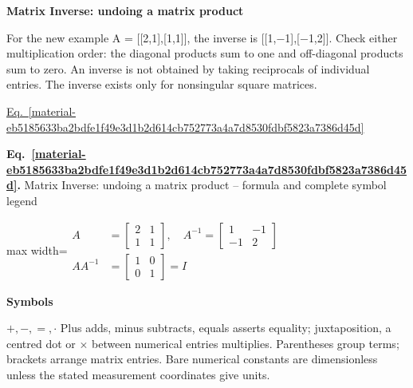 \documentclass[11pt,a4paper]{article}
\begin{document}
\textbf{Matrix Inverse: undoing a matrix product}


For the new example A = [[2,1],[1,1]], the inverse is [[1,\ensuremath{-}1],[\ensuremath{-}1,2]]. Check either multiplication order: the diagonal products sum to one and off-diagonal products sum to zero. An inverse is not obtained by taking reciprocals of individual entries. The inverse exists only for nonsingular square matrices.


\hyperref[material-eb5185633ba2bdfe1f49e3d1b2d614cb752773a4a7d8530fdbf5823a7386d45d]{Eq.~\ref*{material-eb5185633ba2bdfe1f49e3d1b2d614cb752773a4a7d8530fdbf5823a7386d45d}}


\par\medskip
\noindent\begin{minipage}{\linewidth}
\label{material-eb5185633ba2bdfe1f49e3d1b2d614cb752773a4a7d8530fdbf5823a7386d45d}
\noindent\textbf{Eq.~\ref*{material-eb5185633ba2bdfe1f49e3d1b2d614cb752773a4a7d8530fdbf5823a7386d45d}.} Matrix Inverse: undoing a matrix product – formula and complete symbol legend\par\nopagebreak
\begin{center}\begin{adjustbox}{max width=\linewidth}$\displaystyle \begin{aligned}A&=\begin{bmatrix}2&1\\1&1\end{bmatrix},\quad A^{-1}=\begin{bmatrix}1&-1\\-1&2\end{bmatrix}\\AA^{-1}&=\begin{bmatrix}1&0\\0&1\end{bmatrix}=I\end{aligned}$\end{adjustbox}\end{center}

\par\noindent\textbf{Symbols}

\par\noindent\textbf{\(+,-,=,\cdot\)} Plus adds, minus subtracts, equals asserts equality; juxtaposition, a centred dot or \ensuremath{\times} between numerical entries multiplies. Parentheses group terms; brackets arrange matrix entries. Bare numerical constants are dimensionless unless the stated measurement coordinates give units.


\end{minipage}
\end{document}
